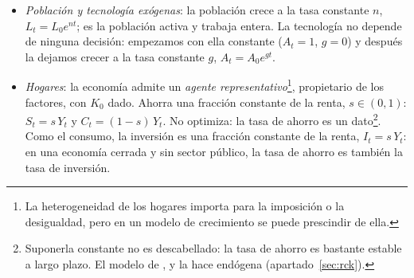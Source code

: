 \documentclass[11pt]{article}
\begin{document}
\begin{itemize}
\begin{itemize}
  \item rendimientos constantes a escala en $K$ y $L$: $F(\kappa K,A\,\kappa L)=\kappa F(K,AL)$ para todo $\kappa>0$. Se escalan los factores rivales, no la tecnología: duplicar fábricas y trabajadores con la misma receta duplica la producción (principio de réplica) ;
  \item las \nocite{Inada1963} (tabla~\ref{tab:inada}): las primeras unidades de cada factor son muy productivas y, cuando abundan, su producto marginal tiende a cero\footnote{Las condiciones de  garantizan que existe un estado estacionario interior. Sin ellas puede no existir o no ser único: si el producto marginal del capital no tiende a cero (o no es lo bastante alto cerca del origen), la curva de inversión no corta a la recta de reposición; si no es decreciente en todo el tramo, puede cortarla varias veces. \textcite{BarelliPessoa2003} sostienen que implican que la función es asintóticamente Cobb-Douglas, aunque \textcite{LitinaPalivos2008} matizan el resultado.}.
  \end{itemize}
\item \emph{Población y tecnología exógenas}: la población crece a la tasa constante $n$, $L_t=L_0e^{nt}$; es la población activa y trabaja entera. La tecnología no depende de ninguna decisión: empezamos con ella constante ($A_t=1$, $g=0$) y después la dejamos crecer a la tasa constante $g$, $A_t=A_0e^{gt}$.
\item \emph{Hogares}: la economía admite un \emph{agente representativo}\footnote{La heterogeneidad de los hogares importa para la imposición o la desigualdad, pero en un modelo de crecimiento se puede prescindir de ella.}, propietario de los factores, con $K_0$ dado. Ahorra una fracción constante de la renta, $s\in(0,1)$: $S_t=s\,Y_t$ y $C_t=(1-s)\,Y_t$. No optimiza: la tasa de ahorro es un dato\footnote{Suponerla constante no es descabellado: la tasa de ahorro es bastante estable a largo plazo. El modelo de ,  y  la hace endógena (apartado~\ref{sec:rck}).}. Como el consumo, la inversión es una fracción constante de la renta, $I_t=s\,Y_t$: en una economía cerrada y sin sector público, la tasa de ahorro es también la tasa de inversión.

\end{itemize}
\end{document}

